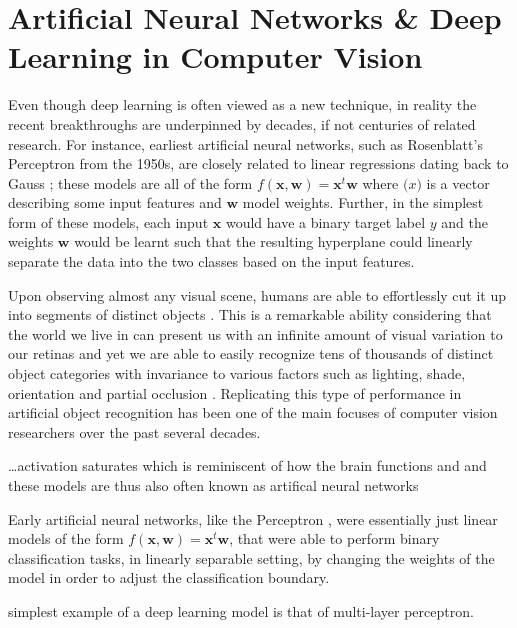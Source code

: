 \documentclass{report}
\begin{document}
\newpage

\chapter{Artificial Neural Networks \& Deep Learning in Computer Vision}

Even though deep learning is often viewed as a new technique, in reality the recent breakthroughs are underpinned by decades, if not centuries of related research. For instance, earliest artificial neural networks, such as Rosenblatt's Perceptron \cite{Rosenblatt1958} from the 1950s, are closely related to linear regressions dating back to Gauss \cite{JurgenSchmidhuber2015}; these models are all of the form $f(\mathbf{x}, \mathbf{w})=\mathbf{x}^t \mathbf{w}$ where $\mathbf(x)$ is a vector describing some input features and $\mathbf{w}$ model weights. Further, in the simplest form of these models, each input $\mathbf{x}$ would have a binary target label $y$ and the weights $\mathbf{w}$ would be learnt such that the resulting hyperplane could 
linearly separate the data into the two classes based on the input features.





Upon observing almost any visual scene, humans are able to effortlessly cut it up into segments of distinct objects \cite{Rosch1976}. This is a remarkable ability considering that the world we live in can present us with an infinite amount of visual variation to our retinas and yet we are able to easily recognize tens of thousands of distinct object categories \cite{Biederman1989} with invariance to various factors such as lighting, shade, orientation and partial occlusion \cite{DiCarlo2012}. Replicating this type of performance in artificial object recognition has been one of the main focuses of computer vision researchers over the past several decades.


\dots activation saturates which is reminiscent of how the brain functions and and these models are thus also often known as artifical neural networks \cite{Goodfellow2016}

Early artificial neural networks, like the Perceptron \cite{Rosenblatt1958}, were essentially just linear models of the form $f(\mathbf{x}, \mathbf{w}) = \mathbf{x}^t \mathbf{w}$, that were able to perform binary classification tasks, in linearly separable setting, by changing the weights of the model in order to adjust the classification boundary. 

simplest example of a deep learning model is that of multi-layer perceptron. 
\end{document}
